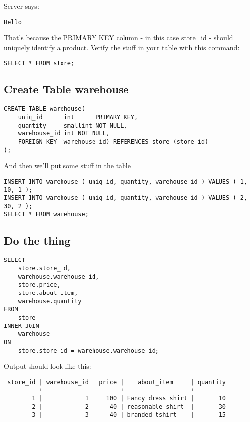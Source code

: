 \documentclass[12pt]{article}
\begin{document}
Server says:
\begin{verbatim}
Hello
\end{verbatim}

That's because the PRIMARY KEY column - in this case store\_id - should uniquely identify a product. Verify the stuff in your table with this command:

\begin{lstlisting}
SELECT * FROM store;
\end{lstlisting}

\subsection{ Create Table warehouse }

\begin{lstlisting}
CREATE TABLE warehouse(
	uniq_id      int      PRIMARY KEY,
	quantity     smallint NOT NULL,
	warehouse_id int NOT NULL,
	FOREIGN KEY (warehouse_id) REFERENCES store (store_id)
);
\end{lstlisting}

And then we'll put some stuff in the table

\begin{lstlisting}
INSERT INTO warehouse ( uniq_id, quantity, warehouse_id ) VALUES ( 1, 10, 1 );
INSERT INTO warehouse ( uniq_id, quantity, warehouse_id ) VALUES ( 2, 30, 2 );
SELECT * FROM warehouse;
\end{lstlisting}

\subsection{ Do the thing }

\begin{lstlisting}
SELECT 
	store.store_id,
	warehouse.warehouse_id,
	store.price,
	store.about_item,
	warehouse.quantity
FROM
	store
INNER JOIN
	warehouse
ON
	store.store_id = warehouse.warehouse_id;
\end{lstlisting}

Output should look like this:

\begin{verbatim}
 store_id | warehouse_id | price |    about_item     | quantity 
----------+--------------+-------+-------------------+----------
        1 |            1 |   100 | Fancy dress shirt |       10
        2 |            2 |    40 | reasonable shirt  |       30
        3 |            3 |    40 | branded tshirt    |       15
\end{verbatim}
\end{document}
